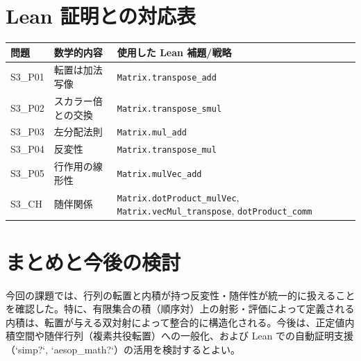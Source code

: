 \documentclass[12pt]{ltjsarticle}
\begin{document}
\section{Lean 証明との対応表}
\begin{center}
  \begin{tabular}{lll}
    \hline
    問題 & 数学的内容 & 使用した Lean 補題/戦略 \\
    \hline
    S3\_P01 & 転置は加法写像 & \texttt{Matrix.transpose\_add} \\
    S3\_P02 & スカラー倍との交換 & \texttt{Matrix.transpose\_smul} \\
    S3\_P03 & 左分配法則 & \texttt{Matrix.mul\_add} \\
    S3\_P04 & 反変性 & \texttt{Matrix.transpose\_mul} \\
    S3\_P05 & 行作用の線形性 & \texttt{Matrix.mulVec\_add} \\
    S3\_CH & 随伴関係 & \texttt{Matrix.dotProduct\_mulVec}, \texttt{Matrix.vecMul\_transpose}, \texttt{dotProduct\_comm} \\
    \hline
  \end{tabular}
\end{center}

\section{まとめと今後の検討}
今回の課題では、行列の転置と内積が持つ反変性・随伴性が統一的に扱えることを確認した。特に、有限集合の積（順序対）上の射影・評価によって定義される内積は、転置が与える双対射によって整合的に構造化される。今後は、正定値内積空間や随伴行列（複素共役転置）への一般化、および Lean での自動証明支援（`simp?`, `aesop_math?`）の活用を検討するとよい。
\end{document}
